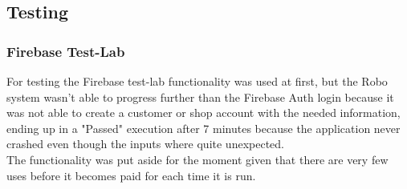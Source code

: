 \subsection{Testing}
\subsubsection{Firebase Test-Lab}
For testing the Firebase test-lab functionality was used at first, but the Robo system wasn't able to progress further than the Firebase Auth login because it was not able to create a customer or shop account with the needed information, ending up in a "Passed" execution after 7 minutes because the application never crashed even though the inputs where quite unexpected.\\
The functionality was put aside for the moment given that there are very few uses before it becomes paid for each time it is run.
